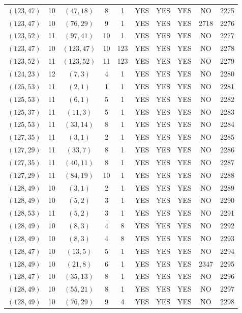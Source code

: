 \begin{longtable}{|c|c|c|c|c|c|c|c|c|c|}
$(123, 47)$ & 10 & $(47, 18)$ & 8 & 1 & YES & YES & YES & NO & 2275\\
$(123, 47)$ & 10 & $(76, 29)$ & 9 & 1 & YES & YES & YES & 2718 & 2276\\
$(123, 52)$ & 11 & $(97, 41)$ & 10 & 1 & YES & YES & YES & NO & 2277\\
$(123, 47)$ & 10 & $(123, 47)$ & 10 & 123 & YES & YES & YES & NO & 2278\\
$(123, 52)$ & 11 & $(123, 52)$ & 11 & 123 & YES & YES & YES & NO & 2279\\
$(124, 23)$ & 12 & $(7, 3)$ & 4 & 1 & YES & YES & YES & NO & 2280\\
$(125, 53)$ & 11 & $(2, 1)$ & 1 & 1 & YES & YES & YES & NO & 2281\\
$(125, 53)$ & 11 & $(6, 1)$ & 5 & 1 & YES & YES & YES & NO & 2282\\
$(125, 37)$ & 11 & $(11, 3)$ & 5 & 1 & YES & YES & YES & NO & 2283\\
$(125, 53)$ & 11 & $(33, 14)$ & 8 & 1 & YES & YES & YES & NO & 2284\\
$(127, 35)$ & 11 & $(3, 1)$ & 2 & 1 & YES & YES & YES & NO & 2285\\
$(127, 29)$ & 11 & $(33, 7)$ & 8 & 1 & YES & YES & YES & NO & 2286\\
$(127, 35)$ & 11 & $(40, 11)$ & 8 & 1 & YES & YES & YES & NO & 2287\\
$(127, 29)$ & 11 & $(84, 19)$ & 10 & 1 & YES & YES & YES & NO & 2288\\
$(128, 49)$ & 10 & $(3, 1)$ & 2 & 1 & YES & YES & YES & NO & 2289\\
$(128, 49)$ & 10 & $(5, 2)$ & 3 & 1 & YES & YES & YES & NO & 2290\\
$(128, 53)$ & 11 & $(5, 2)$ & 3 & 1 & YES & YES & YES & NO & 2291\\
$(128, 49)$ & 10 & $(8, 3)$ & 4 & 8 & YES & YES & YES & NO & 2292\\
$(128, 49)$ & 10 & $(8, 3)$ & 4 & 8 & YES & YES & YES & NO & 2293\\
$(128, 47)$ & 10 & $(13, 5)$ & 5 & 1 & YES & YES & YES & NO & 2294\\
$(128, 49)$ & 10 & $(21, 8)$ & 6 & 1 & YES & YES & YES & 2347 & 2295\\
$(128, 47)$ & 10 & $(35, 13)$ & 8 & 1 & YES & YES & YES & NO & 2296\\
$(128, 49)$ & 10 & $(55, 21)$ & 8 & 1 & YES & YES & YES & NO & 2297\\
$(128, 49)$ & 10 & $(76, 29)$ & 9 & 4 & YES & YES & YES & NO & 2298\\

\end{longtable}
